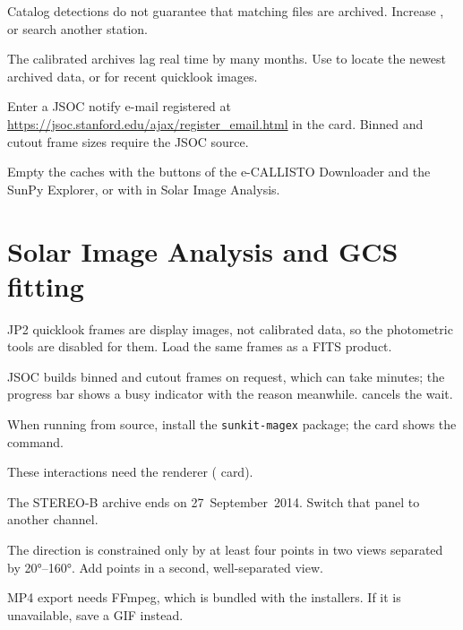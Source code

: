 Catalog detections do not guarantee that matching files are archived. Increase
, or search another station.

The calibrated archives lag real time by many months. Use  to locate the newest
archived data, or  for recent quicklook images.

Enter a JSOC notify e-mail registered at
\url{https://jsoc.stanford.edu/ajax/register_email.html} in the  card. Binned
and cutout frame sizes require the JSOC source.

Empty the caches with the  buttons of the e-CALLISTO Downloader and the SunPy
Explorer, or with  in Solar Image Analysis.

\section{Solar Image Analysis and GCS fitting}

JP2 quicklook frames are display images, not calibrated data, so the photometric tools are
disabled for them. Load the same frames as a FITS product.

JSOC builds binned and cutout frames on request, which can take minutes; the progress bar shows a
busy indicator with the reason meanwhile.  cancels the wait.

When running from source, install the \texttt{sunkit-magex} package; the card shows the command.

These interactions need the  renderer ( card).

The STEREO-B archive ends on 27~September~2014. Switch that panel to another channel.

The direction is constrained only by at least four points in two views separated by
20°--160°. Add points in a second, well-separated view.

MP4 export needs FFmpeg, which is bundled with the installers. If it is unavailable, save a GIF
instead.

